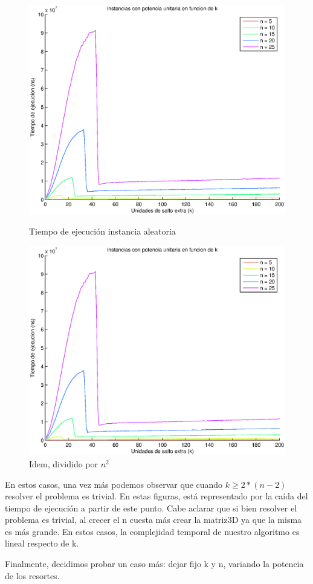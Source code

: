 \begin{figure}[H]
  \begin{minipage}{0.5\linewidth}
    \includegraphics[width=\linewidth]{img/problema3/instancia_p_1_varios_n.eps}
    \caption{Tiempo de ejecución instancia aleatoria}\label{fig:problema3-n}
  \end{minipage}
  \hfill
  \begin{minipage}{0.5\linewidth}
    \includegraphics[width=\linewidth]{img/problema3/instancia_p_1_varios_n_div_n2.eps}
    \caption{Idem, dividido por $n^2$}\label{fig:problema3-n-n2}
  \end{minipage}
\end{figure}

En estos casos, una vez más podemos observar que cuando $k \geq 2*(n-2)$ resolver el problema es trivial. En estas figuras, está representado por la caída del tiempo de ejecución a partir de este punto. Cabe aclarar que si bien resolver el problema es trivial, al crecer el n cuesta más crear la matriz3D ya que la misma es más grande. En estos casos, la complejidad temporal de nuestro algoritmo es lineal respecto de k.

Finalmente, decidimos probar un caso más: dejar fijo k y n, variando la potencia de los resortes.	